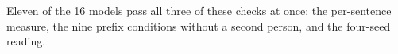 Eleven of the 16 models pass all three of these checks at once: the per-sentence measure, the nine prefix conditions without a second person, and the four-seed reading.
